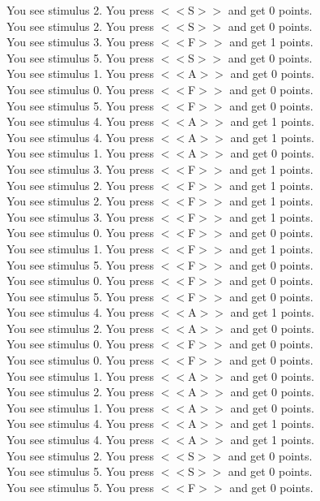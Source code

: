 \documentclass[pdflatex,sn-nature]{sn-jnl}%
\theoremstyle{thmstyleone}%
\theoremstyle{thmstyletwo}%
\theoremstyle{thmstylethree}%
\begin{document}
You see stimulus 2. You press $<<$S$>>$ and get 0 points. $~$\\ 
You see stimulus 2. You press $<<$S$>>$ and get 0 points. $~$\\ 
You see stimulus 3. You press $<<$F$>>$ and get 1 points. $~$\\ 
You see stimulus 5. You press $<<$S$>>$ and get 0 points. $~$\\ 
You see stimulus 1. You press $<<$A$>>$ and get 0 points. $~$\\ 
You see stimulus 0. You press $<<$F$>>$ and get 0 points. $~$\\ 
You see stimulus 5. You press $<<$F$>>$ and get 0 points. $~$\\ 
You see stimulus 4. You press $<<$A$>>$ and get 1 points. $~$\\ 
You see stimulus 4. You press $<<$A$>>$ and get 1 points. $~$\\ 
You see stimulus 1. You press $<<$A$>>$ and get 0 points. $~$\\ 
You see stimulus 3. You press $<<$F$>>$ and get 1 points. $~$\\ 
You see stimulus 2. You press $<<$F$>>$ and get 1 points. $~$\\ 
You see stimulus 2. You press $<<$F$>>$ and get 1 points. $~$\\ 
You see stimulus 3. You press $<<$F$>>$ and get 1 points. $~$\\ 
You see stimulus 0. You press $<<$F$>>$ and get 0 points. $~$\\ 
You see stimulus 1. You press $<<$F$>>$ and get 1 points. $~$\\ 
You see stimulus 5. You press $<<$F$>>$ and get 0 points. $~$\\ 
You see stimulus 0. You press $<<$F$>>$ and get 0 points. $~$\\ 
You see stimulus 5. You press $<<$F$>>$ and get 0 points. $~$\\ 
You see stimulus 4. You press $<<$A$>>$ and get 1 points. $~$\\ 
You see stimulus 2. You press $<<$A$>>$ and get 0 points. $~$\\ 
You see stimulus 0. You press $<<$F$>>$ and get 0 points. $~$\\ 
You see stimulus 0. You press $<<$F$>>$ and get 0 points. $~$\\ 
You see stimulus 1. You press $<<$A$>>$ and get 0 points. $~$\\ 
You see stimulus 2. You press $<<$A$>>$ and get 0 points. $~$\\ 
You see stimulus 1. You press $<<$A$>>$ and get 0 points. $~$\\ 
You see stimulus 4. You press $<<$A$>>$ and get 1 points. $~$\\ 
You see stimulus 4. You press $<<$A$>>$ and get 1 points. $~$\\ 
You see stimulus 2. You press $<<$S$>>$ and get 0 points. $~$\\ 
You see stimulus 5. You press $<<$S$>>$ and get 0 points. $~$\\ 
You see stimulus 5. You press $<<$F$>>$ and get 0 points. 
\end{document}
